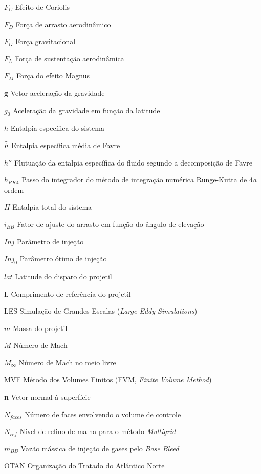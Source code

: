 \begin{siglas}
    \item[\(F_{C}\)] Efeito de Coriolis
    \item[\(F_{D}\)] Força de arrasto aerodinâmico
    \item[\(F_{G}\)] Força gravitacional
    \item[\(F_{L}\)] Força de sustentação aerodinâmica
    \item[\(F_{M}\)] Força do efeito Magnus
    \item[\textbf{g}] Vetor aceleração da gravidade
    \item[\(g_0\)] Aceleração da gravidade em função da latitude
    \item[\(h\)] Entalpia específica do sistema
    \item[\(\Tilde{h}\)] Entalpia específica média de Favre
    \item[\(h''\)] Flutuação da entalpia específica do fluido segundo a decomposição de Favre
    \item[\(h_{RK4}\)] Passo do integrador do método de integração numérica Runge-Kutta de 4\emph{a} ordem
    \item[\(H\)] Entalpia total do sistema
    \item[\(i_{BB}\)] Fator de ajuste do arrasto em função do ângulo de elevação
    \item[\(Inj\)] Parâmetro de injeção
    \item[\(Inj_0\)] Parâmetro ótimo de injeção
    \item[\(lat\)] Latitude do disparo do projetil
    \item[L] Comprimento de referência do projetil
    \item[LES] Simulação de Grandes Escalas (\textit{Large-Eddy Simulations})
    \item[\(m\)] Massa do projetil
    \item[\(M\)] Número de Mach
    \item[\(M_{\infty}\)] Número de Mach no meio livre
    \item[MVF] Método dos Volumes Finitos (FVM, \textit{Finite Volume Method})
    \item[\textbf{n}] Vetor normal à superfície
    \item[\(N_{faces}\)] Número de faces envolvendo o volume de controle
    \item[\(N_{ref}\)] Nível de refino de malha para o método \textit{Multigrid}
    \item[\(\Dot{m_{BB}}\)] Vazão mássica de injeção de gases pelo \textit{Base Bleed}
    \item[OTAN] Organização do Tratado do Atlântico Norte

\end{siglas}
